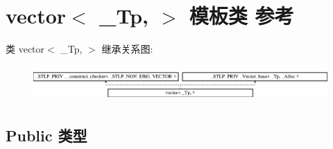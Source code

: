 \hypertarget{structvector}{}\section{vector$<$ \+\_\+\+Tp, $>$ 模板类 参考}
\label{structvector}
类 vector$<$ \+\_\+\+Tp, $>$ 继承关系图\+:\begin{figure}[H]
\begin{center}
\leavevmode
\includegraphics[height=1.389578cm]{structvector}
\end{center}
\end{figure}
\subsection*{Public 类型}
